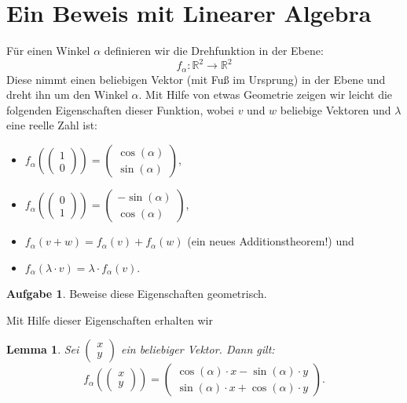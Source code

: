 \documentclass[a4paper,ngerman,12pt]{scrartcl}
\newcommand{\IR}{\mathbb{R}}
\theoremstyle{definition}
\newtheorem{aufg}{Aufgabe}
\theoremstyle{plain}
\newtheorem{lemma}[defn]{Lemma}
\theoremstyle{remark}
\begin{document}
\section{Ein Beweis mit Linearer Algebra}

Für einen Winkel $\alpha$ definieren wir die Drehfunktion in der Ebene:
	\[f_\alpha: \IR^2 \to \IR^2\]
Diese nimmt einen beliebigen Vektor (mit Fuß im Ursprung) in der Ebene und dreht ihn um den Winkel $\alpha$. Mit Hilfe von etwas Geometrie zeigen wir leicht die folgenden Eigenschaften dieser Funktion, wobei $v$ und $w$ beliebige Vektoren und $\lambda$ eine reelle Zahl ist:
\begin{itemize}
	\item $f_\alpha\left(\begin{pmatrix}1 \\ 0\end{pmatrix}\right) = \begin{pmatrix}\cos(\alpha) \\ \sin(\alpha)\end{pmatrix}$,
	\item $f_\alpha\left(\begin{pmatrix}0 \\ 1\end{pmatrix}\right) = \begin{pmatrix}-\sin(\alpha) \\ \cos(\alpha)\end{pmatrix}$,
	\item $f_\alpha(v+w)  = f_\alpha(v) + f_\alpha(w)$ (ein neues Additionstheorem!) und
	\item $f_\alpha(\lambda\cdot v) = \lambda\cdot f_\alpha(v)$.
\end{itemize}

\begin{aufg}
	Beweise diese Eigenschaften geometrisch.
\end{aufg}

Mit Hilfe dieser Eigenschaften erhalten wir

\begin{lemma}\label{lemma:RotationsAbbildung}
	Sei $\begin{pmatrix}x \\ y\end{pmatrix}$ ein beliebiger Vektor. Dann gilt:
		\[f_\alpha\left(\begin{pmatrix}x \\ y\end{pmatrix}\right) = \begin{pmatrix}\cos(\alpha) \cdot x - \sin(\alpha)\cdot y \\ \sin(\alpha)\cdot x + \cos(\alpha)\cdot y\end{pmatrix}.\]
\end{lemma}
\end{document}
